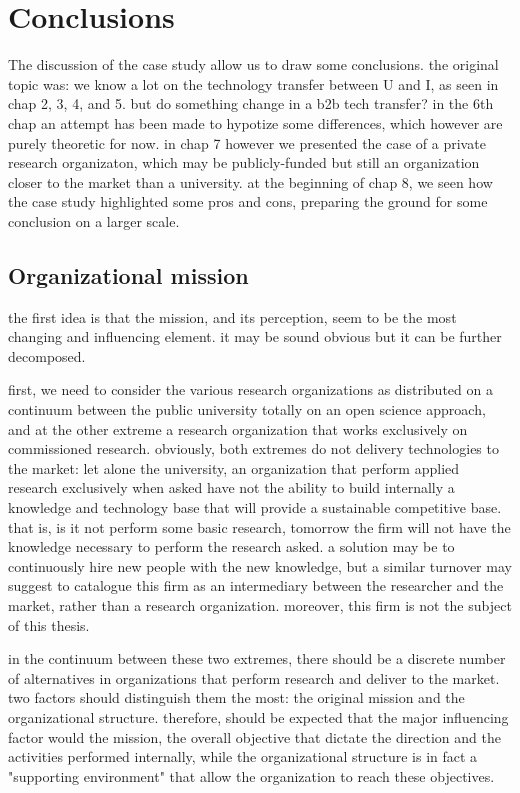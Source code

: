 \section{Conclusions}

The discussion of the case study allow us to draw some conclusions. the original topic was: we know a lot on the technology transfer between U and I, as seen in chap 2, 3, 4, and 5. but do something change in a b2b tech transfer? in the 6th chap an attempt has been made to hypotize some differences, which however are purely theoretic for now. in chap 7 however we presented the case of a private research organizaton, which may be publicly-funded but still an organization closer to the market than a university. at the beginning of chap 8, we seen how the case study highlighted some pros and cons, preparing the ground for some conclusion on a larger scale.

\subsection{Organizational mission}

the first idea is that the mission, and its perception, seem to be the most changing and influencing element. it may be sound obvious but it can be further decomposed.

first, we need to consider the various research organizations as distributed on a continuum between the public university totally on an open science approach, and at the other extreme a research organization that works exclusively on commissioned research. obviously, both extremes do not delivery technologies to the market: let alone the university, an organization that perform applied research exclusively when asked have not the ability to build internally a knowledge and technology base that will provide a sustainable competitive base. that is, is it not perform some basic research, tomorrow the firm will not have the knowledge necessary to perform the research asked. a solution may be to continuously hire new people with the new knowledge, but a similar turnover may suggest to catalogue this firm as an intermediary between the researcher and the market, rather than a research organization. moreover, this firm is not the subject of this thesis.

in the continuum between these two extremes, there should be a discrete number of alternatives in organizations that perform research and deliver to the market. two factors should distinguish them the most: the original mission and the organizational structure. therefore, should be expected that the major influencing factor would the mission, the overall objective that dictate the direction and the activities performed internally, while the organizational structure is in fact a "supporting environment" that allow the organization to reach these objectives. 

